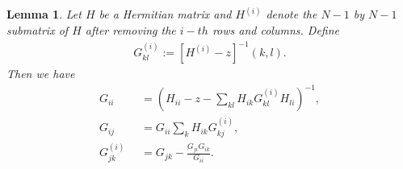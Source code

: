 \documentclass[10pt,reqno]{article}
\theoremstyle{plain} %
\newtheorem{lemma}[theorem]{Lemma}
\theoremstyle{remark}
\numberwithin{equation}{section}
\begin{document}
\begin{lemma} Let $H$ be a Hermitian matrix and $H^{(i)}$ denote the $N-1$ by $N-1$ submatrix of $H$ after removing the $i-t h$ rows and columns.  Define 
\begin{align}\label{def_G(i)}
 G_{kl}^{(i)}:=\left[H^{(i)}-z\right]^{-1}(k,l). 
 \end{align}
Then we have 
\begin{align}\label{GiiSCP}
    G_{ii} &\;\;= \left(H_{ii}-z-\sum_{kl}H_{ik}G^{(i)}_{kl}H_{li}\right)^{-1},
    \\\label{GijSCP2}
   G_{ij} &\;\;= G_{ii} \sum_{k}H_{ik}G^{(i )}_{kj},
\\\label{GijkSCP}
   G^{(i)}_{jk} &\;\;= G_{jk}-\frac{G_{ji}G_{ik}}{G_{ii}} .
   \end{align}
\end{lemma}
\end{document}
